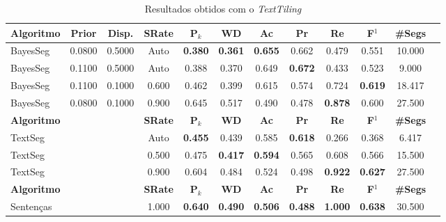 \begin{table}[!h]
\begin{tabular}{|l||c|c|c|c|c|c|c|c|c|c|c|}
\hline
		\textbf{Algoritmo} &
		\textbf{Prior} &
		\textbf{Disp.} & 
		\textbf{SRate}& 
		\textbf{P$_k$} & 
		\textbf{WD} & 
		\textbf{Ac} & 
		\textbf{Pr} & 
		\textbf{Re} &
		\textbf{F$^1$} &
		\textbf{\#Segs} \\	\hline


 BayesSeg & 0.0800 & 0.5000 &  Auto & \cellcolor{gray!20} \textbf{0.380} & \cellcolor{gray!20} \textbf{0.361} & \cellcolor{gray!20} \textbf{0.655} & 0.662 & 0.479 & 0.551 & 10.000  \\ \hline 
 BayesSeg & 0.1100 & 0.5000 &  Auto & 0.388 & 0.370 & 0.649 & \cellcolor{gray!20} \textbf{0.672} & 0.433 & 0.523 & 9.000  \\ \hline 
 BayesSeg & 0.1100 & 0.1000 & 0.600 & 0.462 & 0.399 & 0.615 & 0.574 & 0.724 & \cellcolor{gray!20} \textbf{0.619} & 18.417  \\ \hline 
 BayesSeg & 0.0800 & 0.1000 & 0.900 & 0.645 & 0.517 & 0.490 & 0.478 & \cellcolor{gray!20} \textbf{0.878} & 0.600 & 27.500  \\ \hline 

\hline
		\textbf{Algoritmo} &&&
		\textbf{SRate} & 
		\textbf{P$_k$} & 
		\textbf{WD} & 
		\textbf{Ac} & 
		\textbf{Pr} & 
		\textbf{Re} &
		\textbf{F$^1$} &
		\textbf{\#Segs} \\	\hline

TextSeg &&& Auto & \cellcolor{gray!20} \textbf{0.455} & 0.439 & 0.585 & \cellcolor{gray!20} \textbf{0.618} & 0.266 & 0.368 & 6.417  \\ \hline 
TextSeg &&& 0.500 & 0.475 & \cellcolor{gray!20} \textbf{0.417} & \cellcolor{gray!20} \textbf{0.594} & 0.565 & 0.608 & 0.566 & 15.500  \\ \hline 
TextSeg &&& 0.900 & 0.604 & 0.484 & 0.524 & 0.498 & \cellcolor{gray!20} \textbf{0.922} & \cellcolor{gray!20} \textbf{0.627} & 27.500  \\ \hline 

\hline
		\textbf{Algoritmo} &&&
		\textbf{SRate} & 
		\textbf{P$_k$} & 
		\textbf{WD} & 
		\textbf{Ac} & 
		\textbf{Pr} & 
		\textbf{Re} &
		\textbf{F$^1$} &
		\textbf{\#Segs} \\	\hline


Sentenças &&& 1.000& \cellcolor{gray!20} \textbf{0.640} & \cellcolor{gray!20} \textbf{0.490} & \cellcolor{gray!20} \textbf{0.506} & \cellcolor{gray!20} \textbf{0.488} & \cellcolor{gray!20} \textbf{1.000} & \cellcolor{gray!20} \textbf{0.638} & 30.500  \\ \hline 



	\end{tabular}
	\caption{Resultados obtidos com o \textit{TextTiling}}
	\label{tab:resultadosTT}
\end{table}




